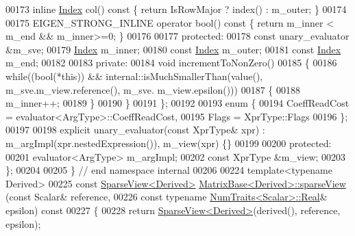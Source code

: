 \begin{DoxyCode}
00173         \textcolor{keyword}{inline} \hyperlink{group___core___module_a554f30542cc2316add4b1ea0a492ff02}{Index} col()\textcolor{keyword}{ const }\{ \textcolor{keywordflow}{return} IsRowMajor ? index() : m\_outer; \}
00174 
00175         EIGEN\_STRONG\_INLINE \textcolor{keyword}{operator} bool()\textcolor{keyword}{ const }\{ \textcolor{keywordflow}{return} m\_inner < m\_end && m\_inner>=0; \}
00176 
00177       \textcolor{keyword}{protected}:
00178         \textcolor{keyword}{const} unary\_evaluator &m\_sve;
00179         \hyperlink{group___core___module_a554f30542cc2316add4b1ea0a492ff02}{Index} m\_inner;
00180         \textcolor{keyword}{const} \hyperlink{group___core___module_a554f30542cc2316add4b1ea0a492ff02}{Index} m\_outer;
00181         \textcolor{keyword}{const} \hyperlink{group___core___module_a554f30542cc2316add4b1ea0a492ff02}{Index} m\_end;
00182 
00183       \textcolor{keyword}{private}:
00184         \textcolor{keywordtype}{void} incrementToNonZero()
00185         \{
00186           \textcolor{keywordflow}{while}((\textcolor{keywordtype}{bool}(*\textcolor{keyword}{this})) && internal::isMuchSmallerThan(value(), m\_sve.m\_view.reference(), m\_sve.
      m\_view.epsilon()))
00187           \{
00188             m\_inner++;
00189           \}
00190         \}
00191     \};
00192     
00193     \textcolor{keyword}{enum} \{
00194       CoeffReadCost = evaluator<ArgType>::CoeffReadCost,
00195       Flags = XprType::Flags
00196     \};
00197     
00198     \textcolor{keyword}{explicit} unary\_evaluator(\textcolor{keyword}{const} XprType& xpr) : m\_argImpl(xpr.nestedExpression()), m\_view(xpr) \{\}
00199 
00200   \textcolor{keyword}{protected}:
00201     evaluator<ArgType> m\_argImpl;
00202     \textcolor{keyword}{const} XprType &m\_view;
00203 \};
00204 
00205 \} \textcolor{comment}{// end namespace internal}
00206 
00224 \textcolor{keyword}{template}<\textcolor{keyword}{typename} Derived>
00225 \textcolor{keyword}{const} \hyperlink{group___sparse_core___module_class_eigen_1_1_sparse_view}{SparseView<Derived>} \hyperlink{group___sparse_core___module_ga320dd291cbf4339c6118c41521b75350}{MatrixBase<Derived>::sparseView}
      (\textcolor{keyword}{const} Scalar& reference,
00226                                                           \textcolor{keyword}{const} \textcolor{keyword}{typename} 
      \hyperlink{group___core___module_struct_eigen_1_1_num_traits}{NumTraits<Scalar>::Real}& epsilon)\textcolor{keyword}{ const}
00227 \textcolor{keyword}{}\{
00228   \textcolor{keywordflow}{return} \hyperlink{group___sparse_core___module_class_eigen_1_1_sparse_view}{SparseView<Derived>}(derived(), reference, epsilon);

\end{DoxyCode}

